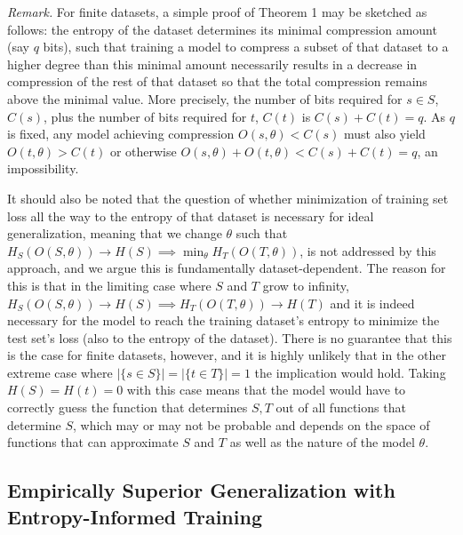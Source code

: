 \documentclass{article}
\begin{document}
    \textit{Remark.}
    For finite datasets, a simple proof of Theorem 1 may be sketched as follows: the entropy of the dataset determines its minimal compression amount (say $q$ bits), such that training a model to compress a subset of that dataset to a higher degree than this minimal amount necessarily results in a decrease in compression of the rest of that dataset so that the total compression remains above the minimal value. More precisely, the number of bits required for $s \in S$, $C(s)$, plus the number of bits required for $t$, $C(t)$ is $C(s) + C(t) = q$. As $q$ is fixed, any model achieving compression $O(s, \theta) < C(s)$ must also yield $O(t, \theta) > C(t)$ or otherwise $O(s, \theta) + O(t, \theta) < C(s) + C(t) = q$, an impossibility. 
    
    It should also be noted that the question of whether minimization of training set loss all the way to the entropy of that dataset is necessary for ideal generalization, meaning that we change $\theta$ such that $H_S(O(S, \theta)) \to H(S) \implies \min_{\theta} H_T(O(T, \theta))$, is not addressed by this approach, and we argue this is fundamentally dataset-dependent. The reason for this is that in the limiting case where $S$ and $T$ grow to infinity, $H_S(O(S, \theta)) \to H(S) \implies H_T(O(T, \theta)) \to H(T)$ and it is indeed necessary for the model to reach the training dataset's entropy to minimize the test set's loss (also to the entropy of the dataset). There is no guarantee that this is the case for finite datasets, however, and it is highly unlikely that in the other extreme case where $|\{s \in S\}| = |\{t \in T\}| = 1$ the implication would hold. Taking $H(S) = H(t) = 0$ with this case means that the model would have to correctly guess the function that determines $S, T$ out of all functions that determine $S$, which may or may not be probable and depends on the space of functions that can approximate $S$ and $T$ as well as the nature of the model $\theta$.

    \subsection{Empirically Superior Generalization with Entropy-Informed Training}
\end{document}
